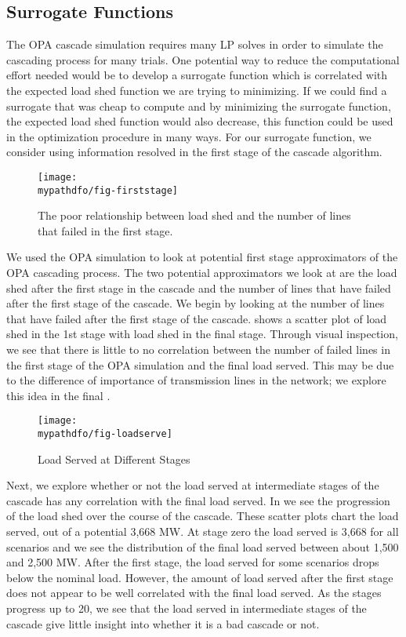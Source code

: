 \subsection{Surrogate Functions}
The OPA cascade simulation requires many LP solves in order to simulate the cascading process for many trials.  One potential way to reduce the computational effort needed would be to develop a surrogate function which is correlated with the expected load shed function we are trying to minimizing.  If we could find a surrogate that was cheap to compute and by minimizing the surrogate function, the expected load shed function would also decrease, this function could be used in the optimization procedure in many ways.   For our surrogate function, we consider using information resolved in the first stage of the cascade algorithm.

\begin{figure}
\centering
\texttt{[image: \\mypathdfo/fig-firststage]}
\caption[Lack of correlation between load shed and first stage line failures]{The poor relationship between load shed and the number of lines that failed in the first stage.}
\label{fig:first}
\end{figure}


We used the OPA simulation to look at potential first stage approximators of the OPA cascading process. The two potential approximators we look at are the load shed after the first stage in the cascade and the number of lines that have failed after the first stage of the cascade.  We begin by looking at the number of lines that have failed after the first stage of the cascade.  shows a scatter plot of load shed in the 1st stage with load shed in the final stage.  Through visual inspection, we see that there is little to no correlation between the number of failed lines in the first stage of the OPA simulation and the final load served.  This may be due to the difference of importance of transmission lines in the network; we explore this idea in the final .


\begin{figure}
\centering
\texttt{[image: \\mypathdfo/fig-loadserve]}
 \caption{Load Served at Different Stages}\label{fig:loadserve}
\end{figure}


Next, we explore whether or not the load served at intermediate stages of the cascade has any correlation with the final load served. In  we see the progression of the load shed over the course of the cascade.  These scatter plots chart the load served, out of a potential 3,668 MW.  At stage zero the load served is 3,668 for all scenarios and we see the distribution of the final load served between about 1,500 and 2,500 MW.  After the first stage, the load served for some scenarios drops below the nominal load.  However, the amount of load served after the first stage does not appear to be well correlated with the final load served.  As the stages progress up to 20, we see that the load served in intermediate stages of the cascade give little insight into whether it is a bad cascade or not.  


